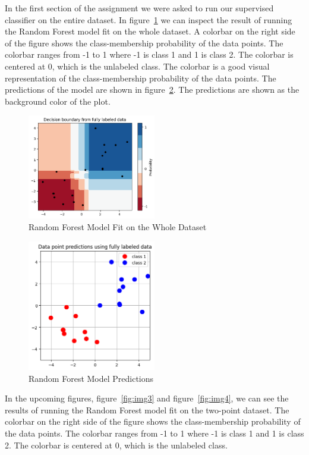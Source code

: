 In the first section of the assignment we were asked to run our supervised classifier on the entire dataset. In figure~\ref{fig:img1} we can inspect the result of running the Random Forest model fit on the whole dataset.
A colorbar on the right side of the figure shows the class-membership probability of the data points. The colorbar ranges from -1 to 1 where -1 is class 1 and 1 is class 2. The colorbar is centered at 0, which is the unlabeled class. 
The colorbar is a good visual representation of the class-membership probability of the data points. The predictions of the model are shown in figure~\ref{fig:img2}. The predictions are shown as the background color of the plot.

\begin{figure}[H]
    \centering
    \includegraphics[width=0.5\textwidth]{images/img1.png}
    \caption{Random Forest Model Fit on the Whole Dataset}
    \label{fig:img1}
\end{figure}

\begin{figure}[H]
    \centering
    \includegraphics[width=0.5\textwidth]{images/img2.png}
    \caption{Random Forest Model Predictions}
    \label{fig:img2}
\end{figure}

In the upcoming figures, figure~\ref{fig:img3} and figure~\ref{fig:img4}, we can see the results of running the Random Forest model fit on the two-point dataset.
The colorbar on the right side of the figure shows the class-membership probability of the data points. The colorbar ranges from -1 to 1 where -1 is class 1 and 1 is class 2. The colorbar is centered at 0, which is the unlabeled class.

